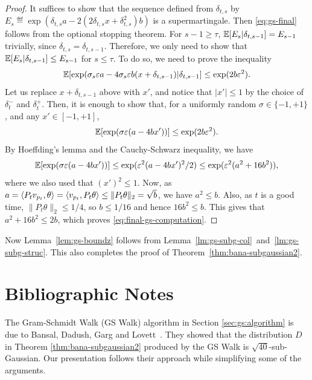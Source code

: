 \begin{proof}
It suffices to show that the sequence defined from $\delta_{t,s}$ by $E_s \eqdef \exp(\delta_{t,s} a -2(2 \delta_{t,s} x + \delta_{t,s}^2 ) b)$ is a supermartingale. Then \eqref{eq:gs-final} follows from the optional stopping theorem. For $s-1 \ge \tau$, $\mathbb{E}[E_s|\delta_{t,s-1}] = E_{s-1}$ trivially, since $\delta_{t,s} = \delta_{t,s-1}$. Therefore, we only need to show that $\mathbb{E}[E_s|\delta_{t,s-1}] \le E_{s-1}$ for $s \le \tau$. To do so, we need to prove the inequality
\begin{equation*}
  \mathbb{E}[\exp(\sigma_s\varepsilon a - 4\sigma_s \varepsilon b(x+\delta_{t,s-1})|\delta_{t,s-1}] \le  \exp({2b\varepsilon^2}).
\end{equation*}
Let us replace $x + \delta_{t,s-1}$ above with $x'$, and notice that $|x'| \le 1$ by the choice of $\delta_{t}^-$ and $\delta_t^+$. Then, it is enough to show that, for a uniformly random $\sigma \in \{-1,+1\}$, and any $x' \in [-1,+1]$,
\begin{equation}
\label{eq:final-gs-computation}
\mathbb{E}[\exp( \sigma \varepsilon (a - 4  bx'))]  \leq \exp(2 b \varepsilon^2).
\end{equation}
By Hoeffding's lemma and the Cauchy-Schwarz inequality, we have
\[
  \mathbb{E}[\exp( \sigma \varepsilon (a - 4  bx'))]
  \le \exp(\varepsilon^2(a - 4bx')^2/2) \le \exp(\varepsilon^2 (a^2 + 16b^2)),
\]
where we also used that $(x')^2 \le 1$.
Now, as $a = \langle P_t v_{p_t},\theta\rangle =\langle v_{p_t}, P_t \theta\rangle \leq \|P_t \theta \|_2 = \sqrt{b}$, we have $a^2 \leq b$. Also, as $t$ is a good time, $\|P_t \theta\|_2\leq 1/4$, so $b \leq 1/16$ and hence $16b^2\leq b$. This gives that $a^2 + 16b^2 \leq  2b$, which proves \eqref{eq:final-gs-computation}. 
\end{proof}

Now Lemma~\ref{lem:gs-boundz} follows from Lemma~\ref{lm:gs-subg-col}~and~\ref{lm:gs-subg-struc}. This also completes the proof of Theorem~\ref{thm:bana-subgaussian2}.

\section{Bibliographic Notes}
The Gram-Schmidt Walk (GS Walk) algorithm in Section \ref{sec:gs:algorithm} is due to Bansal, Dadush, Garg and Lovett~\cite{BansalDGL19}. They showed that the distribution $D$ in Theorem \ref{thm:bana-subgaussian2} produced by the GS Walk is  $\sqrt{40}$-sub-Gaussian.
Our presentation follows their approach while simplifying some of the arguments.

